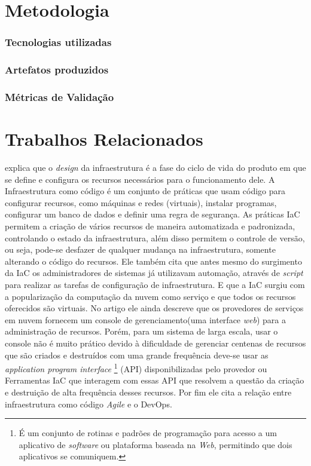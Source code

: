 \section{\esp Metodologia}

\subsubsection{Tecnologias utilizadas}


\subsubsection{Artefatos produzidos}


\subsubsection{Métricas de Validação}


\section{\esp Trabalhos Relacionados} \label{relacionados}


 explica que o \textit{design} da infraestrutura é a fase do ciclo de vida do produto em que se define e configura os recursos necessários para o funcionamento dele. A Infraestrutura como código é um conjunto de práticas que usam código para configurar recursos, como máquinas e redes (virtuais), instalar programas, configurar um banco de dados e definir uma regra de segurança. As práticas IaC permitem a criação de vários recursos de maneira automatizada e padronizada, controlando o estado da infraestrutura, além disso permitem o controle de versão, ou seja, pode-se desfazer de qualquer mudança na infraestrutura, somente alterando o código do recursos. Ele também cita que antes mesmo do surgimento da IaC os administradores de sistemas já utilizavam automação, através de \textit{script} para realizar as tarefas de configuração de infraestrutura. E que a IaC surgiu com a popularização da computação da nuvem como serviço e que todos os recursos oferecidos são virtuais. No artigo ele ainda descreve que os provedores de serviços em nuvem fornecem um console de gerenciamento(uma interface \textit{web}) para a administração de recursos. Porém, para um sistema de larga escala, usar o console não é muito prático devido à dificuldade de gerenciar centenas de recursos que são criados e destruídos com uma grande frequência deve-se usar as \textit{application program interface} \footnote{É um conjunto de rotinas e padrões de programação para acesso a um aplicativo de \textit{software} ou plataforma baseada na \textit{Web}, permitindo que dois aplicativos se comuniquem. } (API) disponibilizadas pelo provedor ou Ferramentas IaC  que interagem com essas API que resolvem a questão da criação e destruição de alta frequência desses recursos. Por fim ele cita a relação entre infraestrutura como código \textit{Agile} e o DevOps. 

